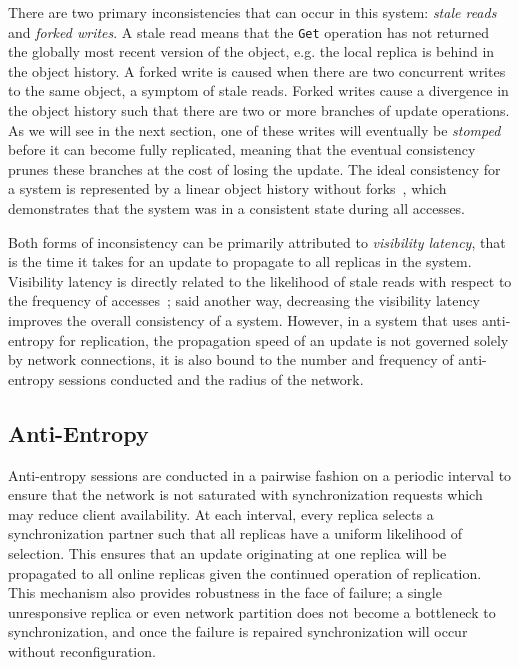 There are two primary inconsistencies that can occur in this system:
\textit{stale reads} and \textit{forked writes}.
A stale read means that the \texttt{Get} operation has not returned
the globally most recent version of the object, e.g. the local replica is
behind in the object history.
A forked write is caused when there are two concurrent writes to the same
object, a symptom of stale reads.
Forked writes cause a divergence in the object history such that there are
two or more branches of update operations.
As we will see in the next section, one of these writes will eventually be
\textit{stomped} before it can become fully replicated, meaning that the
eventual consistency prunes these branches at the cost of losing
the update.
The ideal consistency for a system is represented by a linear object history
without forks~\cite{bernstein_rethinking_2013}, which demonstrates that the
system was in a consistent state during all accesses.

Both forms of inconsistency can be primarily attributed to \emph{visibility
latency}, that is the time it takes for an update to propagate to all
replicas in the system.
Visibility latency is directly related to the likelihood of stale reads with
respect to the frequency of accesses~\cite{bailis_quantifying_2014}; said
another way, decreasing the visibility latency improves the overall
consistency of a system.
However, in a system that uses anti-entropy for replication, the propagation
speed of an update is not governed solely by network connections, it is also
bound to the number and frequency of anti-entropy sessions conducted and the
radius of the network.

\subsection*{Anti-Entropy}

Anti-entropy sessions are conducted in a pairwise fashion on a periodic
interval to ensure that the network is not saturated with synchronization
requests which may reduce client availability.
At each interval, every replica selects a synchronization partner such that
all replicas have a uniform likelihood of selection.
This ensures that an update originating at one replica will be propagated to
all online replicas given the continued operation of replication.
This mechanism also provides robustness in the face of failure; a single
unresponsive replica or even network partition does not become a bottleneck
to synchronization, and once the failure is repaired synchronization will
occur without reconfiguration.

